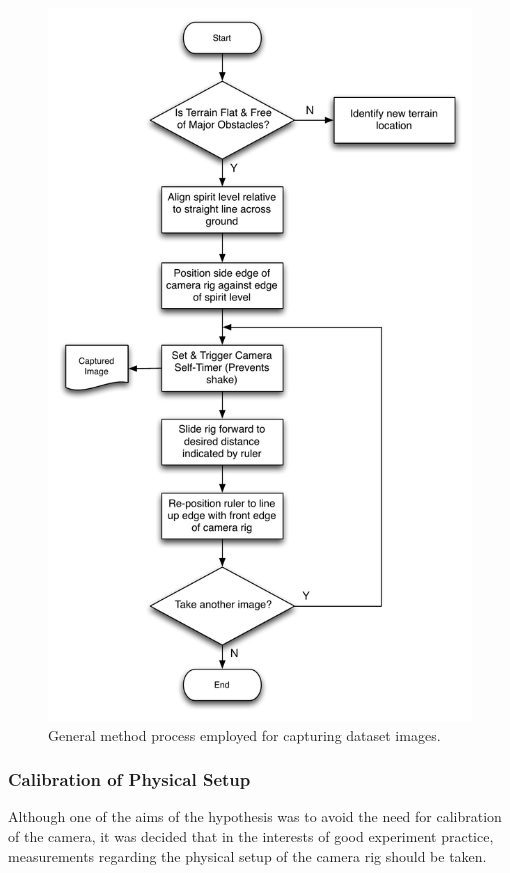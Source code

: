 \clearpage
\begin{figure}[ht!]
\centering
\includegraphics[scale=0.8]{images/camera_flow.pdf}
  \caption{General method process employed for capturing dataset images.}
\label{fig:flow}
\end{figure}
\clearpage

\subsubsection{Calibration of Physical Setup}

Although one of the aims of the hypothesis was to avoid the need for calibration of the camera, it was decided that in the interests of good experiment practice, measurements regarding the physical setup of the camera rig should be taken. 

